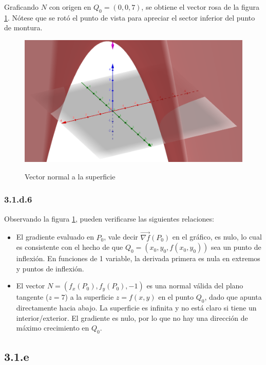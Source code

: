 \documentclass{article}
\begin{document}
Graficando $N$ con origen en $Q_0 = (0,0,7)$, se obtiene el vector rosa de la figura \ref{fig:1-d-5}. Nótese que se rotó el punto de vista para apreciar el sector inferior del punto de montura.

\begin{figure}[ht]
\caption{Vector normal a la superficie}
\includegraphics[scale=0.25]{img/ejercicios/3/1-d-5.png} 
\centering
\label{fig:1-d-5}
\end{figure}

\subsubsection*{3.1.d.6}
\label{subsubsec:3.1.d.6}

Observando la figura \ref{fig:1-d-5}, pueden verificarse las siguientes relaciones:

\begin{itemize}
\item El gradiente evaluado en $P_0$, vale decir $\overrightarrow{ \nabla f}(P_0)$ en el gráfico, es nulo, lo cual es consistente con el hecho de que $Q_0 = (x_0,y_0,f(x_0,y_0))$ sea un punto de inflexión. En funciones de 1 variable, la derivada primera es nula en extremos y puntos de inflexión.
\item El vector $N = (f_x(P_0), f_y(P_0), -1)$ es una normal válida del plano tangente ($z=7$) a la superficie $z = f(x,y)$ en el punto $Q_0$, dado que apunta directamente hacia abajo. La superficie es infinita y no está claro si tiene un interior/exterior. El gradiente es nulo, por lo que no hay una dirección de máximo crecimiento en $Q_0$.
\end{itemize}

\subsection*{3.1.e}
\label{subsec:3.1.e}
\end{document}
